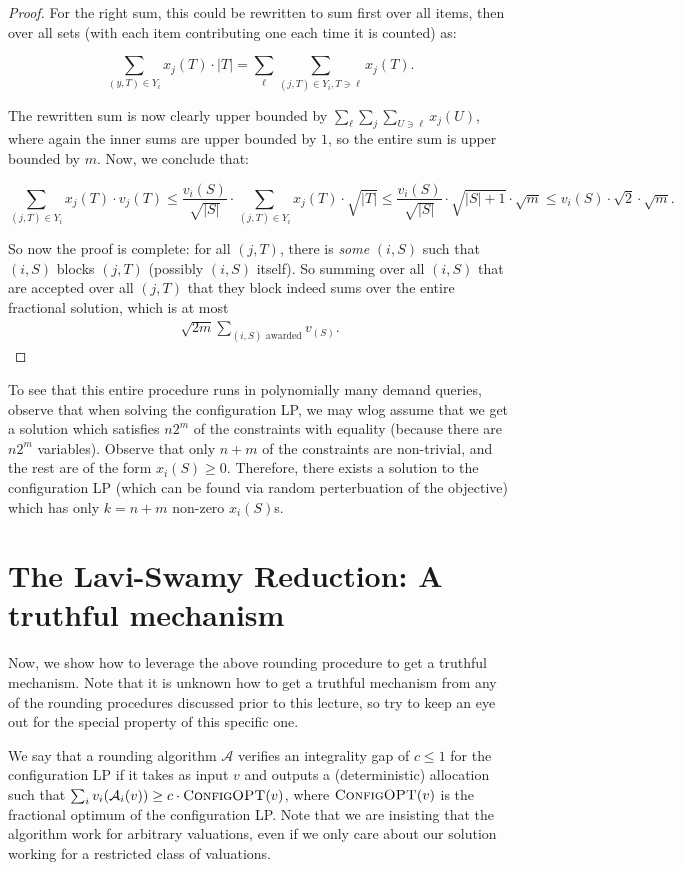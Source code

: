 \begin{proof}
For the right sum, this could be rewritten to sum first over all items, then over all sets (with each item contributing one each time it is counted) as:

$$\sum_{(y, T) \in Y_i} x_j(T) \cdot |T| = \sum_\ell \sum_{(j, T) \in Y_i, T \ni \ell} x_j(T).$$

The rewritten sum is now clearly upper bounded by $\sum_\ell \sum_j \sum_{U \ni \ell} x_j(U)$, where again the inner sums are upper bounded by $1$, so the entire sum is upper bounded by $m$. Now, we conclude that:

$$\sum_{(j, T) \in Y_i} x_j(T) \cdot v_j(T)  \leq \frac{v_i(S)}{\sqrt{|S|}} \cdot \sum_{(j, T) \in Y_i} x_j(T) \cdot \sqrt{|T|} \leq \frac{v_i(S)}{\sqrt{|S|}} \cdot \sqrt{|S|+1} \cdot \sqrt{m} \leq v_i(S) \cdot \sqrt{2} \cdot \sqrt{m}.$$

So now the proof is complete: for all $(j,T)$, there is \emph{some} $(i,S)$ such that $(i,S)$ blocks $(j,T)$ (possibly $(i,S)$ itself). So summing over all $(i,S)$ that are accepted over all $(j,T)$ that they block indeed sums over the entire fractional solution, which is at most 
\begin{align*}
    \sqrt{2m} \sum_{(i,S)\text{ awarded}} v_(S). 
\end{align*}
\end{proof}

To see that this entire procedure runs in polynomially many demand queries, observe that when solving the configuration LP, we may wlog assume that we get a solution which satisfies $n2^m$ of the constraints with equality (because there are $n2^m$ variables). Observe that only $n+m$ of the constraints are non-trivial, and the rest are of the form $x_i(S) \geq 0$. Therefore, there exists a solution to the configuration LP (which can be found via random perterbuation of the objective) which has only $k = n+m$ non-zero $x_i(S)$s. 

\section{The Lavi-Swamy Reduction: A truthful mechanism}
Now, we show how to leverage the above rounding procedure to get a truthful mechanism. Note that it is unknown how to get a truthful mechanism from any of the rounding procedures discussed prior to this lecture, so try to keep an eye out for the special property of this specific one.

\begin{definition}We say that a rounding algorithm $\mathcal{A}$ verifies an integrality gap of $c\leq 1$ for the configuration LP if it takes as input $v$ and outputs a (deterministic) allocation such that $\sum_i v_i(\mathcal{A}_i(v)) \geq c\cdot \textsc{ConfigOPT}(v)$, where $\textsc{ConfigOPT}(v)$ is the fractional optimum of the configuration LP. Note that we are insisting that the algorithm work for arbitrary valuations, even if we only care about our solution working for a restricted class of valuations.
\end{definition}

